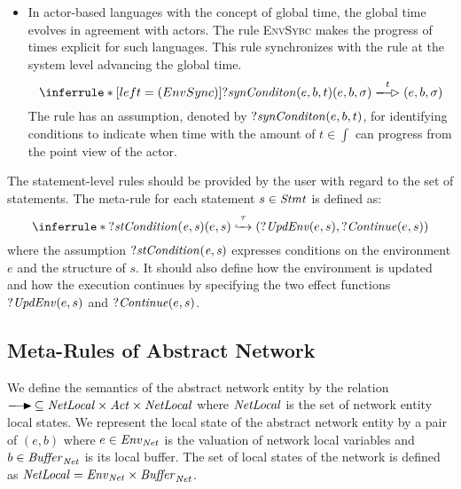 \begin{itemize}

\item In actor-based languages with the concept of global time, the global time evolves in agreement with actors. The rule \textsc{EnvSybc} makes the progress of times explicit for such languages. This rule synchronizes with the rule at the system level advancing the global time.
\[
\inferrule*[left = (EnvSync)]{?{\it synConditon}(e,b,t)}{(e,b,\sigma)\aoverto{t}(e,b,\sigma)}
\]The rule has an assumption, denoted by $?{\it synConditon}(e,b,t)$, for identifying conditions to indicate when time with  the amount of $t\in \int$ can progress from the point view of the actor.  %
\end{itemize}


The statement-level rules should be provided by the user with regard to the set of statements. The meta-rule for each statement $s\in\mathit{Stmt}$ is defined as:
\[
\inferrule*{?{\it stCondition(e,s)}}{(e,s)\stoverto{\tau}(?{\it UpdEnv}(e,s),?{\it Continue}(e,s))}
\]where the assumption $?{\it stCondition(e,s)}$ expresses conditions on the environment $e$ and the structure of $s$. It should also define how the environment is updated and how the execution continues by specifying the two effect functions $?{\it UpdEnv}(e,s)$ and $?{\it Continue}(e,s)$. 
\subsection{Meta-Rules of Abstract Network}
We define the semantics of the abstract network entity by the relation $\noverto{}\,\subseteq {\it NetLocal}\times\Act \times {\it NetLocal}$ where ${\it NetLocal}$ is the set of network entity local states. We represent the local state of the abstract network entity by a pair of $(e,b)$ where $e\in\mathit{Env}_{\it Net}$ is the valuation of network local variables and $b\in\mathit{Buffer}_{\it Net}$ is its local buffer.  The set of local states of the network is defined as ${\it NetLocal}=\mathit{Env}_{\it Net}\times \mathit{Buffer}_{\it Net}$.

